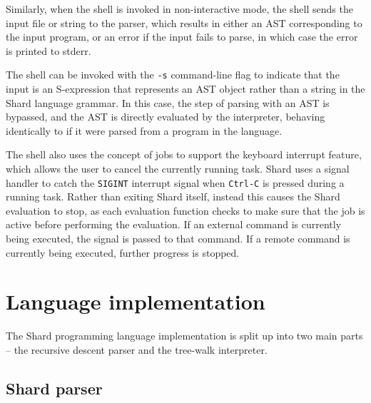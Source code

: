 \documentclass[twoside]{report}
\begin{document}
Similarly, when the shell is invoked in non-interactive mode, the shell sends the input file or string to the parser, which results in either an AST corresponding to the input program, or an error if the input fails to parse, in which case the error is printed to stderr.

The shell can be invoked with the \texttt{-s} command-line flag to indicate that the input is an S-expression that represents an AST object rather than a string in the Shard language grammar. In this case, the step of parsing with an AST is bypassed, and the AST is directly evaluated by the interpreter, behaving identically to if it were parsed from a program in the language.

The shell also uses the concept of jobs to support the keyboard interrupt feature, which allows the user to cancel the currently running task.
Shard uses a signal handler to catch the \texttt{SIGINT} interrupt signal when \texttt{Ctrl-C} is pressed during a running task.
Rather than exiting Shard itself, instead this causes the Shard evaluation to stop, as each evaluation function checks to make sure that the job is active before performing the evaluation.
If an external command is currently being executed, the signal is passed to that command. If a remote command is currently being executed, further progress is stopped.

\section{Language implementation}


The Shard programming language implementation is split up into two main parts -- the recursive descent parser and the tree-walk interpreter.

\subsection{Shard parser}
\end{document}
